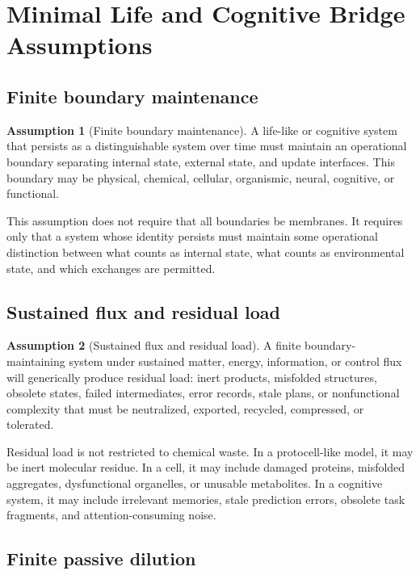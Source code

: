 \documentclass[10pt,a4paper,twocolumn,aps,prl]{revtex4-2}
\theoremstyle{claimstyle}
\theoremstyle{definition}
\newtheorem*{assumption}{Assumption}
\begin{document}
\section{Minimal Life and Cognitive Bridge Assumptions}

\subsection{Finite boundary maintenance}

\begin{assumption}[Finite boundary maintenance]
A life-like or cognitive system that persists as a distinguishable system over time must maintain an operational boundary separating internal state, external state, and update interfaces. This boundary may be physical, chemical, cellular, organismic, neural, cognitive, or functional.
\end{assumption}

This assumption does not require that all boundaries be membranes. It requires only that a system whose identity persists must maintain some operational distinction between what counts as internal state, what counts as environmental state, and which exchanges are permitted.

\subsection{Sustained flux and residual load}

\begin{assumption}[Sustained flux and residual load]
A finite boundary-maintaining system under sustained matter, energy, information, or control flux will generically produce residual load: inert products, misfolded structures, obsolete states, failed intermediates, error records, stale plans, or nonfunctional complexity that must be neutralized, exported, recycled, compressed, or tolerated.
\end{assumption}

Residual load is not restricted to chemical waste. In a protocell-like model, it may be inert molecular residue. In a cell, it may include damaged proteins, misfolded aggregates, dysfunctional organelles, or unusable metabolites. In a cognitive system, it may include irrelevant memories, stale prediction errors, obsolete task fragments, and attention-consuming noise.

\subsection{Finite passive dilution}
\end{document}

